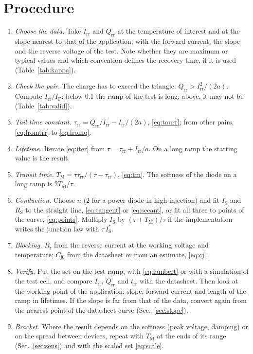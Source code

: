 \documentclass[10pt,a4paper]{scrartcl}
\newcommand{\IF}{I_\mathrm{F}}
\newcommand{\Irr}{I_\mathrm{rr}}
\newcommand{\Qrr}{Q_\mathrm{rr}}
\newcommand{\trr}{t_\mathrm{rr}}
\newcommand{\taurr}{\tau_\mathrm{rr}}
\newcommand{\TM}{T_\mathrm{M}}
\newcommand{\IS}{I_\mathrm{S}}
\newcommand{\RS}{R_\mathrm{S}}
\newcommand{\Rr}{R_\mathrm{r}}
\newcommand{\Cjo}{C_\mathrm{j0}}
\begin{document}
\section{Procedure}
\label{sec:procedure}
\begin{enumerate}
\item \emph{Choose the data.} Take $\Irr$ and $\Qrr$ at the temperature of interest and at the slope nearest to that of the application, with the forward current, the slope and the reverse voltage of the test. Note whether they are maximum or typical values and which convention defines the recovery time, if it is used (Table~\ref{tab:kappa}).
\item \emph{Check the pair.} The charge has to exceed the triangle: $\Qrr > \Irr^2/(2a)$. Compute $\Irr/\IF$: below \num{0.1} the ramp of the test is long; above, it may not be (Table~\ref{tab:valid}).
\item \emph{Tail time constant.} $\taurr = \Qrr/\Irr - \Irr/(2a)$, \eqref{eq:taurr}; from other pairs, \eqref{eq:fromtrr} to \eqref{eq:fromq}.
\item \emph{Lifetime.} Iterate \eqref{eq:iter} from $\tau = \taurr + \Irr/a$. On a long ramp the starting value is the result.
\item \emph{Transit time.} $\TM = \tau\taurr/(\tau-\taurr)$, \eqref{eq:tm}. The softness of the diode on a long ramp is $2\TM/\tau$.
\item \emph{Conduction.} Choose $n$ (2 for a power diode in high injection) and fit $\IS$ and $\RS$ to the straight line, \eqref{eq:tangent} or \eqref{eq:secant}, or fit all three to points of the curve, \eqref{eq:points}. Multiply $\IS$ by $(\tau+\TM)/\tau$ if the implementation writes the junction law with $\tau\,\IS^{*}$.
\item \emph{Blocking.} $\Rr$ from the reverse current at the working voltage and temperature; $\Cjo$ from the datasheet or from an estimate, \eqref{eq:cj}.
\item \emph{Verify.} Put the set on the test ramp, with \eqref{eq:lambert} or with a simulation of the test cell, and compare $\Irr$, $\Qrr$ and $\trr$ with the datasheet. Then look at the working point of the application: slope, forward current and length of the ramp in lifetimes. If the slope is far from that of the data, convert again from the nearest point of the datasheet curve (Sec.~\ref{sec:slope}).
\item \emph{Bracket.} Where the result depends on the softness (peak voltage, damping) or on the spread between devices, repeat with $\TM$ at the ends of its range (Sec.~\ref{sec:sens}) and with the scaled set \eqref{eq:scale}.
\end{enumerate}
\end{document}
